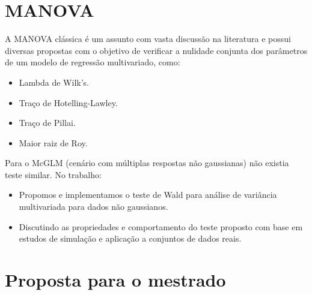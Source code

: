 \documentclass[10pt,
  aspectratio=169,
  serif,
  mathserif,
  professionalfont,
  compress,
  handout,
  ]{beamer}\usepackage[]{graphicx}\usepackage[]{color}
\begin{document}

\section{MANOVA}

\begin{frame}[c, allowframebreaks]

A MANOVA clássica é um assunto com vasta discussão na literatura e possui diversas propostas com o objetivo de verificar a nulidade conjunta dos parâmetros de um modelo de regressão multivariado, como: 

\begin{itemize}
  \item Lambda de Wilk’s.
  \item Traço de Hotelling-Lawley.
  \item Traço de Pillai.
  \item Maior raiz de Roy.
\end{itemize}


Para o McGLM (cenário com múltiplas respostas não gaussianas) não existia teste similar. No trabalho:

\begin{itemize}
  \item Propomos e implementamos o teste de Wald para análise de variância multivariada para dados não gaussianos.
  \item Discutindo as propriedades e comportamento do teste proposto com base em estudos de simulação e aplicação a conjuntos de dados reais.
\end{itemize}

\end{frame}


\section{Proposta para o mestrado}
\end{document}
